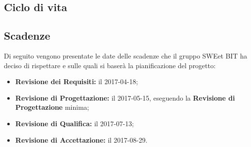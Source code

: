 \subsection{Ciclo di vita}
\subsection{Scadenze}
Di seguito vengono presentate le date delle scadenze che il gruppo SWEet BIT ha deciso di rispettare e sulle quali si baserà la pianificazione del progetto: \\
\begin{itemize}
	\item \textbf{Revisione dei Requisiti:} il 2017-04-18;
	\item \textbf{Revisione di Progettazione:} il 2017-05-15, eseguendo la \textbf{Revisione di Progettazione} minima;
	\item \textbf{Revisione di Qualifica:} il 2017-07-13;
	\item \textbf{Revisione di Accettazione:} il 2017-08-29.
\end{itemize}